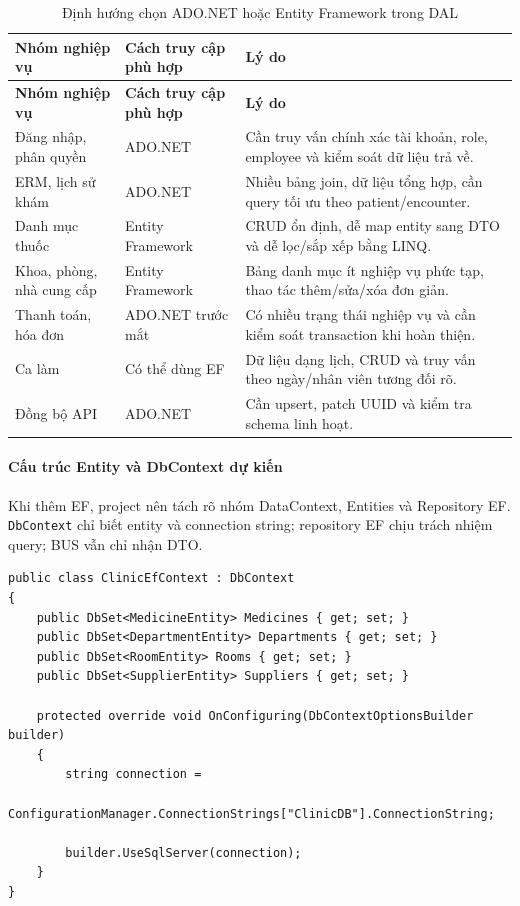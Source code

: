 \documentclass[12pt,a4paper]{article}
\numberwithin{figure}{subsection}
\numberwithin{table}{subsection}
\newcounter{codecounter}
\newenvironment{codeblock}[2]{%
    \refstepcounter{codecounter}%
    \phantomsection%
    \label{#1}%
    \par\smallskip
}{%
    \par\smallskip
}
\begin{document}
\begin{longtable}{|p{3.5cm}|p{4.8cm}|p{5.5cm}|}
\caption{Định hướng chọn ADO.NET hoặc Entity Framework trong DAL} \\
\hline
\textbf{Nhóm nghiệp vụ} & \textbf{Cách truy cập phù hợp} & \textbf{Lý do} \\
\hline
\endfirsthead
\hline
\textbf{Nhóm nghiệp vụ} & \textbf{Cách truy cập phù hợp} & \textbf{Lý do} \\
\hline
\endhead
Đăng nhập, phân quyền & ADO.NET & Cần truy vấn chính xác tài khoản, role, employee và kiểm soát dữ liệu trả về. \\
\hline
ERM, lịch sử khám & ADO.NET & Nhiều bảng join, dữ liệu tổng hợp, cần query tối ưu theo patient/encounter. \\
\hline
Danh mục thuốc & Entity Framework & CRUD ổn định, dễ map entity sang DTO và dễ lọc/sắp xếp bằng LINQ. \\
\hline
Khoa, phòng, nhà cung cấp & Entity Framework & Bảng danh mục ít nghiệp vụ phức tạp, thao tác thêm/sửa/xóa đơn giản. \\
\hline
Thanh toán, hóa đơn & ADO.NET trước mắt & Có nhiều trạng thái nghiệp vụ và cần kiểm soát transaction khi hoàn thiện. \\
\hline
Ca làm & Có thể dùng EF & Dữ liệu dạng lịch, CRUD và truy vấn theo ngày/nhân viên tương đối rõ. \\
\hline
Đồng bộ API & ADO.NET & Cần upsert, patch UUID và kiểm tra schema linh hoạt. \\
\hline
\end{longtable}

\paragraph{Cấu trúc Entity và DbContext dự kiến}

Khi thêm EF, project nên tách rõ nhóm DataContext, Entities và Repository EF. \texttt{DbContext} chỉ biết entity và connection string; repository EF chịu trách nhiệm query; BUS vẫn chỉ nhận DTO.

\begin{codeblock}{code:ef-context-implementation}{Cài đặt DbContext dự kiến}
\begin{verbatim}
public class ClinicEfContext : DbContext
{
    public DbSet<MedicineEntity> Medicines { get; set; }
    public DbSet<DepartmentEntity> Departments { get; set; }
    public DbSet<RoomEntity> Rooms { get; set; }
    public DbSet<SupplierEntity> Suppliers { get; set; }

    protected override void OnConfiguring(DbContextOptionsBuilder builder)
    {
        string connection =
            ConfigurationManager.ConnectionStrings["ClinicDB"].ConnectionString;

        builder.UseSqlServer(connection);
    }
}
\end{verbatim}
\end{codeblock}
\end{document}
